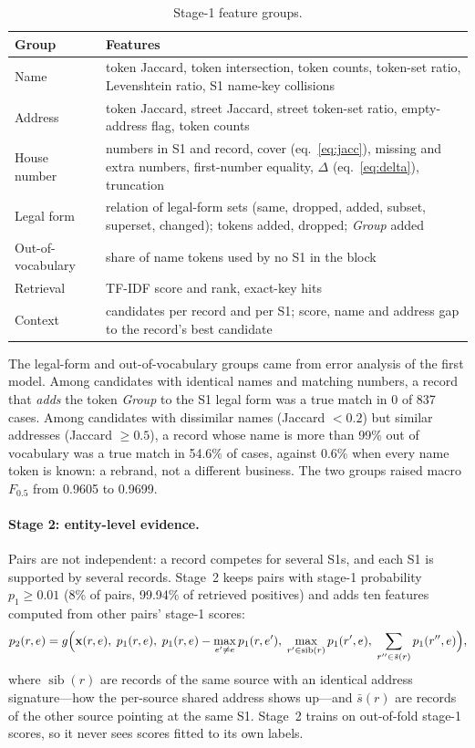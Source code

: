 \documentclass[10pt]{article}
\newcommand{\Fh}{F_{0.5}}
\begin{document}
\begin{table}[htbp]
\centering\small
\caption{Stage-1 feature groups.}
\label{tab:features}
\begin{tabularx}{\linewidth}{@{}lX@{}}
\toprule
Group & Features \\
\midrule
Name & token Jaccard, token intersection, token counts, token-set ratio, Levenshtein ratio, S1 name-key collisions \\
Address & token Jaccard, street Jaccard, street token-set ratio, empty-address flag, token counts \\
House number & numbers in S1 and record, cover (eq.~\ref{eq:jacc}), missing and extra numbers, first-number equality, $\Delta$ (eq.~\ref{eq:delta}), truncation \\
Legal form & relation of legal-form sets (same, dropped, added, subset, superset, changed); tokens added, dropped; \emph{Group} added \\
Out-of-vocabulary & share of name tokens used by no S1 in the block \\
Retrieval & TF-IDF score and rank, exact-key hits \\
Context & candidates per record and per S1; score, name and address gap to the record's best candidate \\
\bottomrule
\end{tabularx}
\end{table}

The legal-form and out-of-vocabulary groups came from error analysis of the first model. Among candidates with identical names and matching numbers, a record that \emph{adds} the token \emph{Group} to the S1 legal form was a true match in 0 of 837 cases. Among candidates with dissimilar names (Jaccard $< 0.2$) but similar addresses (Jaccard $\ge 0.5$), a record whose name is more than 99\% out of vocabulary was a true match in 54.6\% of cases, against 0.6\% when every name token is known: a rebrand, not a different business. The two groups raised macro $\Fh$ from 0.9605 to 0.9699.

\paragraph{Stage 2: entity-level evidence.} Pairs are not independent: a record competes for several S1s, and each S1 is supported by several records. Stage~2 keeps pairs with stage-1 probability $p_1 \ge 0.01$ (8\% of pairs, 99.94\% of retrieved positives) and adds ten features computed from other pairs' stage-1 scores:
\begin{equation}
p_2(r,e) = g\Bigl(\mathbf{x}(r,e),\; p_1(r,e),\; p_1(r,e) - \max_{e'\ne e} p_1(r,e'),\; \max_{r'\in\operatorname{sib}(r)} p_1(r',e),\; \sum_{r''\in\bar s(r)} p_1(r'',e)\Bigr),
\label{eq:stage2}
\end{equation}
where $\operatorname{sib}(r)$ are records of the same source with an identical address signature---how the per-source shared address shows up---and $\bar s(r)$ are records of the other source pointing at the same S1. Stage~2 trains on out-of-fold stage-1 scores, so it never sees scores fitted to its own labels.
\end{document}

